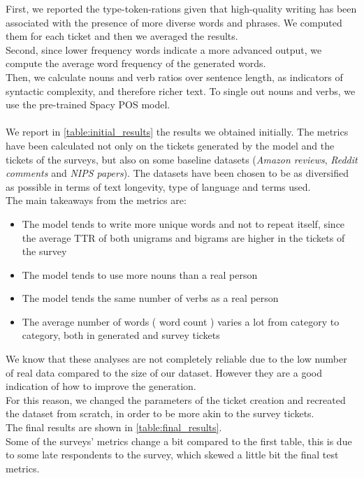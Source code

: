 First, we reported the type-token-rations given that high-quality writing has been associated with the presence of more diverse words and phrases\cite{pitler2008revisiting}. We computed them for each ticket and then we averaged the results. \\
Second, since lower frequency words indicate a more advanced output\cite{crossley2011development}, we compute the average word frequency of the generated words.\\
Then, we calculate nouns and verb ratios over sentence length, as indicators of syntactic complexity, and therefore richer text\cite{mcnamara2010linguistic}. To single out nouns and verbs, we use the pre-trained Spacy POS model. \\\\
We report in \autoref{table:initial_results} the results we obtained initially. The metrics have been calculated not only on the tickets generated by the model and the tickets of the surveys, but also on some baseline datasets (\textit{Amazon reviews}, \textit{Reddit comments} and \textit{NIPS papers}). The datasets have been chosen to be as diversified as possible in terms of text longevity, type of language and terms used. \\ %
The main takeaways from the metrics are:
\begin{itemize}
    \item The model tends to write more unique words and not to repeat itself, since the average TTR of both unigrams and bigrams are higher in the tickets of the survey
    \item The model tends to use more nouns than a real person
    \item The model tends the same number of verbs as a real person
    \item The average number of words ( word count ) varies a lot from category to category, both in generated and survey tickets
\end{itemize}
We know that these analyses are not completely reliable due to the low number of real data compared to the size of our dataset. However they are a good indication of how to improve the generation. \\
For this reason, we changed the parameters of the ticket creation and recreated the dataset from scratch, in order to be more akin to the survey tickets. \\
The final results are shown in \autoref{table:final_results}. \\
Some of the surveys' metrics change a bit compared to the first table, this is due to some late respondents to the survey, which skewed a little bit the final test metrics.

